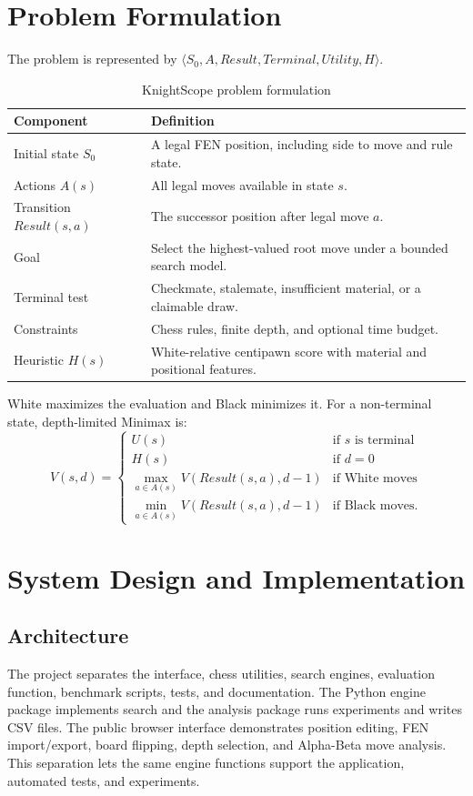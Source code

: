 \documentclass[12pt,a4paper]{report}
\begin{document}
\chapter{Problem Formulation}
The problem is represented by $\langle S_0,A,Result,Terminal,Utility,H\rangle$.
\begin{table}[H]\centering\caption{KnightScope problem formulation}
\begin{tabular}{p{}p{}}\toprule
Component & Definition\\\midrule
Initial state $S_0$ & A legal FEN position, including side to move and rule state.\\
Actions $A(s)$ & All legal moves available in state $s$.\\
Transition $Result(s,a)$ & The successor position after legal move $a$.\\
Goal & Select the highest-valued root move under a bounded search model.\\
Terminal test & Checkmate, stalemate, insufficient material, or a claimable draw.\\
Constraints & Chess rules, finite depth, and optional time budget.\\
Heuristic $H(s)$ & White-relative centipawn score with material and positional features.\\\bottomrule
\end{tabular}\end{table}

White maximizes the evaluation and Black minimizes it. For a non-terminal state, depth-limited Minimax is:
\[
V(s,d)=\begin{cases}U(s)&\text{if }s\text{ is terminal}\\H(s)&\text{if }d=0\\
\max_{a\in A(s)}V(Result(s,a),d-1)&\text{if White moves}\\
\min_{a\in A(s)}V(Result(s,a),d-1)&\text{if Black moves.}\end{cases}
\]

\chapter{System Design and Implementation}
\section{Architecture}
The project separates the interface, chess utilities, search engines, evaluation function, benchmark scripts, tests, and documentation. The Python engine package implements search and the analysis package runs experiments and writes CSV files. The public browser interface demonstrates position editing, FEN import/export, board flipping, depth selection, and Alpha-Beta move analysis. This separation lets the same engine functions support the application, automated tests, and experiments.
\end{document}
